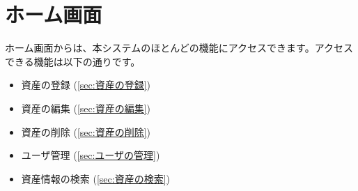 \documentclass[11ptm]{jsarticle}
\begin{document}
\clearpage
\section{ホーム画面}
\label{sec:ホーム画面}
ホーム画面からは、本システムのほとんどの機能にアクセスできます。アクセスできる機能は以下の通りです。
\begin{itemize}
  \item 資産の登録 (\!\ref{sec:資産の登録})
  \item 資産の編集 (\!\ref{sec:資産の編集})
  \item 資産の削除 (\!\ref{sec:資産の削除})
  \item ユーザ管理 (\!\ref{sec:ユーザの管理})
  \item 資産情報の検索 (\!\ref{sec:資産の検索})
\end{itemize}
\end{document}
